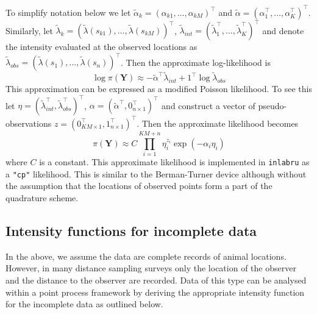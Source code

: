 \documentclass{stylefile16/statsoc}
\newcommand{\bm}{\boldsymbol}  %
\newcommand{\tl}{\tilde{\lambda}}   %
\begin{document}
To simplify notation below we let $\tilde{\alpha}_{k} = (\alpha_{k1}, \ldots, \alpha_{kM})^\intercal$ and $\tilde{\alpha} = (\alpha_1^\intercal, \ldots, \alpha_K^\intercal)^\intercal$.  Similarly, let $\tl_k = (\tl(s_{k1}), \ldots, \tl(s_{kM}))^\intercal$, $\tl_{int} = (\tl_1^\intercal, \ldots, \tl_K^\intercal)^\intercal$ and denote the intensity evaluated at the observed locations as $\tl_{obs} = (\tl(s_1), \ldots, \tl(s_n))^\intercal$.  Then the approximate log-likelihood is
\begin{equation}
\label{approx-log-likelihood}
	\log \pi(\bm{Y}) \approx - \tilde{\alpha}^\intercal \tl_{int} + 1^\intercal\log\tl_{obs}
\end{equation}
This approximation can be expressed as a modified Poisson likelihood.  To see this let $\eta = (\tl_{int}^\intercal, \tl_{obs}^\intercal)^\intercal$,
$\alpha = (\tilde{\alpha}^\intercal, 0_{n \times 1}^\intercal)^\intercal$ and construct a vector of pseudo-observations $z = (0_{KM\times 1}^\intercal, 1_{n \times 1}^\intercal)^\intercal$.  Then the approximate likelihood becomes
\begin{equation}
\pi(\bm{Y}) \approx C \prod\limits_{i=1}^{KM + n} \eta_i^{z_i}\exp(-\alpha_i\eta_i)
\end{equation}
where $C$ is a constant.  This approximate likelihood is implemented in \texttt{inlabru} as a \texttt{"cp"} likelihood.  This is similar to the Berman-Turner device \citep{berman_approximating_1992, baddeley_practical_2000} although without the assumption that the locations of observed points form a part of the quadrature scheme.

\subsection{Intensity functions for incomplete data}

In the above, we assume the data are complete records of animal locations.  However, in many distance sampling surveys only the location of the observer and the distance to the observer are recorded.  Data of this type can be analysed within a point process framework by deriving the appropriate intensity function for the incomplete data as outlined below.
\end{document}
